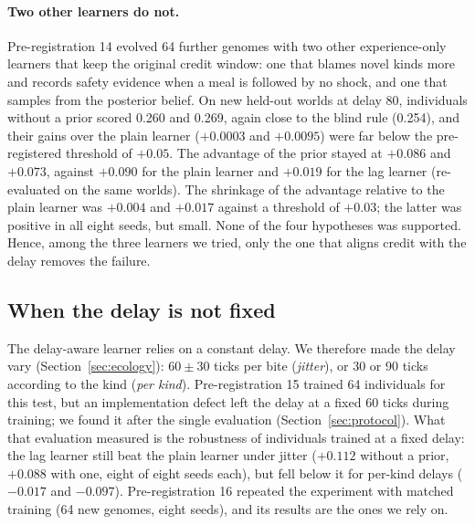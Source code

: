 \paragraph{Two other learners do not.}
Pre-registration 14 evolved 64 further genomes with two other experience-only learners that keep the original credit window: one that blames novel kinds more and records safety evidence when a meal is followed by no shock, and one that samples from the posterior belief. On new held-out worlds at delay 80, individuals without a prior scored 0.260 and 0.269, again close to the blind rule (0.254), and their gains over the plain learner ($+0.0003$ and $+0.0095$) were far below the pre-registered threshold of $+0.05$. The advantage of the prior stayed at $+0.086$ and $+0.073$, against $+0.090$ for the plain learner and $+0.019$ for the lag learner (re-evaluated on the same worlds). The shrinkage of the advantage relative to the plain learner was $+0.004$ and $+0.017$ against a threshold of $+0.03$; the latter was positive in all eight seeds, but small. None of the four hypotheses was supported. Hence, among the three learners we tried, only the one that aligns credit with the delay removes the failure.

\subsection{When the delay is not fixed}
\label{sec:res-variable}
The delay-aware learner relies on a constant delay. We therefore made the delay vary (Section~\ref{sec:ecology}): $60\pm30$ ticks per bite (\emph{jitter}), or 30 or 90 ticks according to the kind (\emph{per kind}). Pre-registration 15 trained 64 individuals for this test, but an implementation defect left the delay at a fixed 60 ticks during training; we found it after the single evaluation (Section~\ref{sec:protocol}). What that evaluation measured is the robustness of individuals trained at a fixed delay: the lag learner still beat the plain learner under jitter ($+0.112$ without a prior, $+0.088$ with one, eight of eight seeds each), but fell below it for per-kind delays ($-0.017$ and $-0.097$). Pre-registration 16 repeated the experiment with matched training (64 new genomes, eight seeds), and its results are the ones we rely on.

